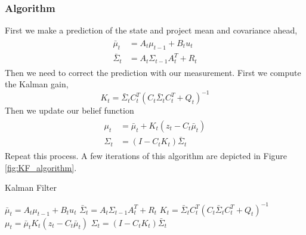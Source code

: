\documentclass[twoside]{article}
\begin{document}
\subsubsection{Algorithm}
First we make a prediction of the state and project mean and covariance ahead,
\begin{align}
\begin{split}
\bar{\mu}_t &= A_t\mu_{t-1}+B_t u_t \\
\bar{\Sigma}_t &= A_t\Sigma_{t-1} A_t^{T} + R_t
\end{split}
\label{LinDyn}
\end{align}
Then we need to correct the prediction with our measurement. First we compute the Kalman gain,
\begin{equation}
K_t = \bar{\Sigma}_{t}C_t^{T}(C_t\bar{\Sigma}_{t}C_t^{T}+Q_t)^{-1}
\end{equation}
Then we update our belief function
\begin{align}
\begin{split}
\mu_t &= \bar{\mu}_t + K_t(z_t-C_t\bar\mu_{t})\\
\Sigma_t &= (I-C_t K_t)\bar{\Sigma}_t
\end{split}
\label{KF}
\end{align}
Repeat this process.
A few iterations of this algorithm are depicted in Figure \ref{fig:KF_algorithm}.

\begin{algorithm}[H]
\caption{Kalman Filter}
	$	\bar{\mu}_t = A_t\mu_{t-1}+B_t u_t$\;
	$	\bar{\Sigma}_t = A_t\Sigma_{t-1} A_t^{T} + R_t$\;
	$ 	K_t = \bar{\Sigma}_{t}C_t^{T}(C_t\bar{\Sigma}_{t}C_t^{T}+Q_t)^{-1}$\;
	$    \mu_t = \bar{\mu}_t K_t(z_t-C_t\bar\mu_{t})$\;
	$   \Sigma_t = (I-C_t K_t)\bar{\Sigma}_t$\;
\end{algorithm}
\end{document}
